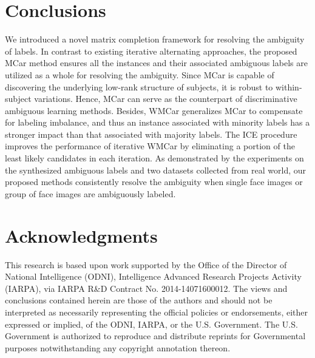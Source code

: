 \documentclass[10pt,journal,compsoc]{IEEEtran}
\begin{document}
\section{Conclusions}\label{Chapter_MCar:sec:Con}
We introduced a novel matrix completion framework for resolving the ambiguity of labels. In contrast to existing iterative alternating approaches, the proposed MCar method ensures all the instances and their associated ambiguous labels are utilized as a whole for resolving the ambiguity. Since MCar is capable of discovering the underlying low-rank structure of subjects, it is robust to within-subject variations. Hence, MCar can serve as the counterpart of discriminative ambiguous learning methods. Besides, WMCar generalizes MCar to compensate for labeling imbalance, and thus an instance associated with minority labels has a stronger impact than that associated with majority labels.
The ICE procedure improves the performance of iterative WMCar by eliminating a portion of the least likely candidates in each iteration.
As demonstrated by the experiments on the synthesized ambiguous labels and two datasets collected from real world, our proposed methods consistently resolve the ambiguity when single face images or group of face images are ambiguously labeled.


\section*{Acknowledgments}
This research is based upon work supported by the Office of the Director of National Intelligence (ODNI), Intelligence Advanced Research Projects
Activity (IARPA), via IARPA R\&D Contract No. 2014-14071600012. The views and conclusions contained herein are those of the authors and should
not be interpreted as necessarily representing the official policies or endorsements, either expressed or implied, of the ODNI, IARPA, or the U.S. Government. The U.S. Government is authorized to reproduce and distribute reprints for Governmental purposes notwithstanding any copyright annotation
thereon.


\IEEEdisplaynontitleabstractindextext
\end{document}
